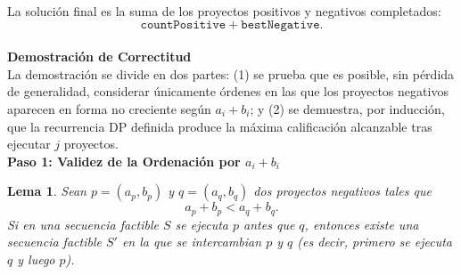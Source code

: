 ﻿\documentclass{article}
\theoremstyle{plain}
\newtheorem{lemma}{Lema}
\theoremstyle{definition}
\begin{document}
La solución final es la suma de los proyectos positivos y negativos completados:
\[
\texttt{countPositive} + \texttt{bestNegative}.
\]
\\

\textbf{Demostración de Correctitud}
\\

La demostración se divide en dos partes: (1) se prueba que es posible, sin pérdida de generalidad, considerar únicamente órdenes en las que los proyectos negativos aparecen en forma no creciente según \(a_i+b_i\); y (2) se demuestra, por inducción, que la recurrencia DP definida produce la máxima calificación alcanzable tras ejecutar \(j\) proyectos.
\\

\textbf{Paso 1: Validez de la Ordenación por \(a_i+b_i\)}

\begin{lemma}
Sean \(p=(a_p,b_p)\) y \(q=(a_q,b_q)\) dos proyectos negativos tales que
\[
a_p+b_p < a_q+b_q.
\]
Si en una secuencia factible \(S\) se ejecuta \(p\) antes que \(q\), entonces existe una secuencia factible \(S'\) en la que se intercambian \(p\) y \(q\) (es decir, primero se ejecuta \(q\) y luego \(p\)).
\end{lemma}
\end{document}
